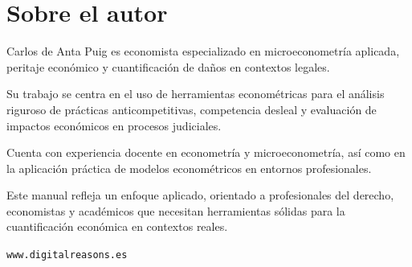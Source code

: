 \chapter*{Sobre el autor}

Carlos de Anta Puig es economista especializado en microeconometría aplicada, peritaje económico y cuantificación de daños en contextos legales.

Su trabajo se centra en el uso de herramientas econométricas para el análisis riguroso de prácticas anticompetitivas, competencia desleal y evaluación de impactos económicos en procesos judiciales.

Cuenta con experiencia docente en econometría y microeconometría, así como en la aplicación práctica de modelos econométricos en entornos profesionales.

Este manual refleja un enfoque aplicado, orientado a profesionales del derecho, economistas y académicos que necesitan herramientas sólidas para la cuantificación económica en contextos reales.

\vfill

\begin{center}
\texttt{www.digitalreasons.es}
\end{center}

\clearpage